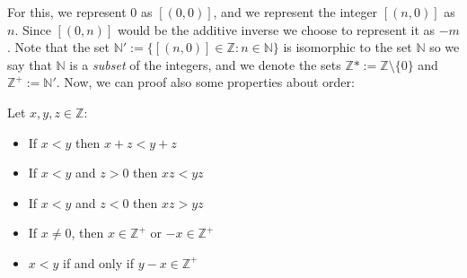 \documentclass{tufte-handout}
\begin{document}
For this, we represent $0$ as $[(0, 0)]$, and we represent the integer $[(n, 0)]$ as $n$. Since $[(0, n)]$ would be the additive inverse we choose to represent it as $-m$. Note that the set $\mathbb{N}' := \{[(n, 0)] \in \mathbb{Z}: n \in \mathbb{N}\}$ is isomorphic to the set $\mathbb{N}$ so we say that $\mathbb{N}$ is a \textit{subset} of the integers, and we denote the sets $\mathbb{Z}* := \mathbb{Z} \setminus \{0\}$ and $\mathbb{Z}^+ := \mathbb{N}'$. Now, we can proof also some properties about order:
\begin{theorem}
	Let $x, y, z \in \mathbb{Z}$:
	\begin{itemize}
		\item If $x < y$ then $x + z < y + z$
		\item If $x < y$ and $z > 0$ then $xz < yz$
		\item If $x < y$ and $z < 0$ then $xz > yz$
		\item If $x \neq 0$, then $x \in \mathbb{Z}^+$ or $-x \in \mathbb{Z}^+$
		\item $x < y$ if and only if $y - x \in \mathbb{Z}^+$
	\end{itemize}
\end{theorem}
\end{document}
